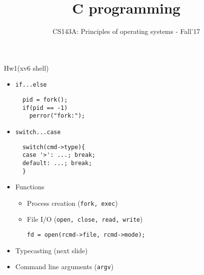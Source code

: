 \documentclass[10pt]{beamer}
\title{C programming} %
\subtitle{CS143A: Principles of operating systems - Fall'17}
\date{}
\institute{UC Irvine, California}
\begin{document}
\maketitle


\iffalse
\begin{frame}{Data types}
\begin{itemize}
\item char (1 byte)
\item int, long (4/8 bytes)
\item float, double
\end{itemize}
\end{frame}

\begin{frame}{Loops}
\begin{itemize}
\item \texttt{for}
\item \texttt{do...while}
\item \texttt{while}
\end{itemize}
\end{frame}
\fi

\begin{frame}[fragile]{Hw1(xv6 shell)}
\begin{itemize}
\item<1-> \texttt{if...else}
\begin{verbatim}
  pid = fork();
  if(pid == -1)
    perror("fork:");
\end{verbatim}
\item<2-> \texttt{switch...case}
\begin{verbatim}
  switch(cmd->type){
  case '>': ...; break;
  default: ...; break;
  }
\end{verbatim}
\item<3-> Functions
\begin{itemize}
\item Process creation (\texttt{fork, exec})
\item File I/O (\texttt{open, close, read, write})
\begin{verbatim}
fd = open(rcmd->file, rcmd->mode);
\end{verbatim}
\end{itemize}
\item<4-> Typecasting (next slide)
\item<5-> Command line arguments (\texttt{argv})
\end{itemize}
\end{frame}
\end{document}

